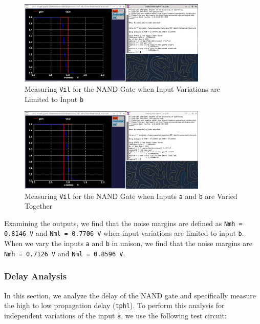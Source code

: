 \documentclass[fleqn]{article}
\begin{document}
	\begin{figure}[H]
		\centerline{\includegraphics[width=0.8\textwidth]{nand_noise_analysis_sweep_vb.png}}
		\caption{Measuring \texttt{Vil} for the NAND Gate when Input Variations are Limited to Input \texttt{b}}
		\label{fig::nand_noise_analysis_sweep_vb}
	\end{figure}
	
	\begin{figure}[H]
		\centerline{\includegraphics[width=0.8\textwidth]{nand_noise_analysis_sweep_va_vb.png}}
		\caption{Measuring \texttt{Vil} for the NAND Gate when Inputs \texttt{a} and \texttt{b} are Varied Together}
		\label{fig::nand_noise_analysis_sweep_va_vb}
	\end{figure}
	
	Examining the outputs, we find that the noise margins are defined as \texttt{Nmh = 0.8146 V} and \texttt{Nml = 0.7706 V} when input variations are limited to input \texttt{b}. When we vary the inputs \texttt{a} and \texttt{b} in unison, we find that the noise margins are \texttt{Nmh = 0.7126 V} and \texttt{Nml = 0.8596 V}.
	
	\subsubsection{Delay Analysis}
	
	In this section, we analyze the delay of the NAND gate and specifically measure the high to low propagation delay (\texttt{tphl}). To perform this analysis for independent variations of the input \texttt{a}, we use the following test circuit:
	
\end{document}
